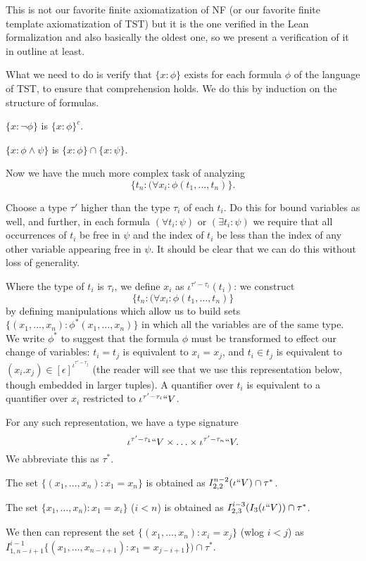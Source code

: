 \documentclass[112pt]{article}
\begin{document}
This is not our favorite finite axiomatization of NF (or our favorite finite template axiomatization of TST) but it is the one verified in the Lean formalization and also basically the oldest one, so we present a verification of it in outline at least.

What we need to do is verify that $\{x:\phi\}$ exists for each formula $\phi$ of the language of TST, to ensure that comprehension holds.  We do this by induction on the structure of formulas.

$\{x:\neg \phi\}$ is $\{x :\phi\}^c$.

$\{x :\phi \wedge \psi\}$ is $\{x:\phi \} \cap \{x:\psi\}$.

Now we have the much more complex task of analyzing $$\{t_{n}:(\forall x_i:\phi(t_1,\ldots,t_n)\}.$$

Choose a type $\tau'$ higher than the type $\tau_i$ of each $t_i$.  Do this for bound variables
as well, and further, in each formula $(\forall t_i:\psi)$ or $(\exists t_i:\psi)$ we require that all occurrences of $t_i$ be free in $\psi$ and the index of $t_i$ be less than the index
of any other variable appearing free in $\psi$.  It should be clear that we can do this without loss of generality.

Where the type of $t_i$ is $\tau_i$, we define $x_i$ as $\iota^{\tau'-\tau_i}(t_i)$:  we construct $$\{t_{n}:(\forall x_i:\phi(t_1,\ldots,t_n)\}$$ by defining manipulations which allow us to build sets $\{(x_1,\ldots,x_n):\phi^*(x_1,\ldots,x_n)\}$ in which
all the variables are of the same type.  We write $\phi^*$ to suggest that the formula $\phi$ must be transformed to effect our change of variables:  $t_i = t_j$ is equivalent to $x_i = x_j$, and $t_i \in t_j$ is equivalent to $(x_i.x_j) \in [\epsilon]^{\iota^{\tau'-\tau_j}}$ (the reader will see that we use this representation below, though embedded in larger tuples).  A quantifier over $t_i$ is equivalent to a quantifier over $x_i$ restricted to $\iota^{\tau'-\tau_i}``V$.

For any such representation, we have a type signature $$\iota^{\tau'-\tau_1}``V \times \ldots \times \iota^{\tau'-\tau_n}``V.$$  We abbreviate this as $\tau^*$.

The set $\{(x_1,\ldots,x_n):x_1 = x_n\}$ is obtained as $I_{2,2}^{n-2}(\iota``V)\cap \tau^*$.

The set $\{x_1,\dots,x_n):x_1 = x_i\}$ ($i<n$) is obtained as $I_{2,3}^{i-3}(I_3(\iota``V))\cap \tau^*$.

We then can represent the
set $\{(x_1,\ldots,x_n):x_i = x_j\}$ (wlog $i<j$) as \newline $I_{1,n-i+1}^{i-1}\{(x_1,\ldots,x_{n-i+1}):x_1 = x_{j-i+1}\})\cap \tau^*$.
\end{document}
